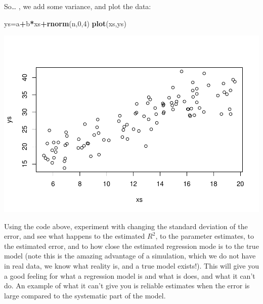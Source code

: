 \documentclass[
]{book}
\newenvironment{Shaded}{\begin{snugshade}}{\end{snugshade}}
\newcommand{\DecValTok}[1]{\textcolor[rgb]{0.00,0.00,0.81}{#1}}
\newcommand{\FunctionTok}[1]{\textcolor[rgb]{0.13,0.29,0.53}{\textbf{#1}}}
\newcommand{\NormalTok}[1]{#1}
\newcommand{\OtherTok}[1]{\textcolor[rgb]{0.56,0.35,0.01}{#1}}
\newcommand{\SpecialCharTok}[1]{\textcolor[rgb]{0.81,0.36,0.00}{\textbf{#1}}}
\begin{document}
So\ldots{} , we add some variance, and plot the data:

\begin{Shaded}
\begin{Highlighting}[]
\NormalTok{ys}\OtherTok{=}\NormalTok{a}\SpecialCharTok{+}\NormalTok{b}\SpecialCharTok{*}\NormalTok{xs}\SpecialCharTok{+}\FunctionTok{rnorm}\NormalTok{(n,}\DecValTok{0}\NormalTok{,}\DecValTok{4}\NormalTok{)}
\FunctionTok{plot}\NormalTok{(xs,ys)}
\end{Highlighting}
\end{Shaded}

\includegraphics{ECOMODbook_files/figure-latex/a6.25-1.pdf}

Using the code above, experiment with changing the standard deviation of the error, and see what happens to the estimated \(R^2\), to the parameter estimates, to the estimated error, and to how close the estimated regression mode is to the true model (note this is the amazing advantage of a simulation, which we do not have in real data, we know what reality is, and a true model exists!). This will give you a good feeling for what a regression model is and what is does, and what it can't do. An example of what it can't give you is reliable estimates when the error is large compared to the systematic part of the model.
\end{document}
